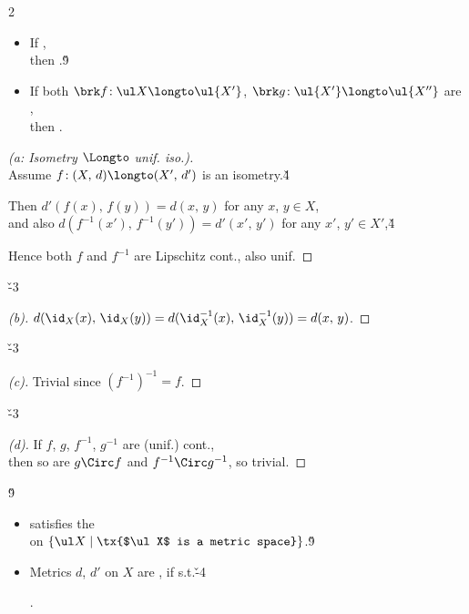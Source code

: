 \documentclass[dvipdfmx,a4paper,titlepage,9pt]{jsarticle}
\begin{document}
\begin{multicols*}{2}
\begin{itemize}[label=-]
\item If ,\\
then .\v9

\item If both $\brk f\!:\ul X\longto\ul{X'}$, $\brk g\!:\ul{X'}\longto\ul{X''}$ are ,\\
then .
\end{itemize}

\begin{pfbox}\rnc{\qedsymbol}{\Sq}
\begin{proof}[\color{TGreen}(a: Isometry $\Longto$ unif. iso.)]\\
Assume $f\!:(X,\,d)\longto(X',\,d')$ is an isometry.\v4

Then $d'(f(x),\,f(y))=d(x,\,y)$ for any $x$, $y\in X$,\\
and also $d(f^{-1}(x'),\,f^{-1}(y'))=d'(x',\,y')$ for any $x'$, $y'\in X'$,\v4

Hence both $f$ and $f^{-1}$ are Lipschitz cont., also unif.
\end{proof}\v{-3}

\dotfill

\begin{proof}[\color{TGreen}(b)] $d(\id_X(x),\,\id_X(y))=d(\id_X^{-1}(x),\,\id_X^{-1}(y))=d(x,\,y)$.
\end{proof}\v{-3}

\dotfill

\begin{proof}[\color{TGreen}(c)] Trivial since $(f^{-1})^{-1}=f$.
\end{proof}\v{-3}

\dotfill

\begin{proof}[\color{TGreen}(d)] If $f$, $g$, $f^{-1}$, $g^{-1}$ are (unif.) cont.,\\
then so are $g\Circ f$ and $f^{-1}\Circ g^{-1}$, so trivial.
\end{proof}
\end{pfbox}\v9

\begin{itemize}[label=-]
\item {} satisfies the \\
on $\{\ul X\mid\tx{$\ul X$ is a metric space}\}$.\v9

\item Metrics $d$, $d'$ on $X$ are , if  s.t.\v{-4}
\begin{center}
.
\end{center}
\end{itemize}


\end{multicols*}
\end{document}
